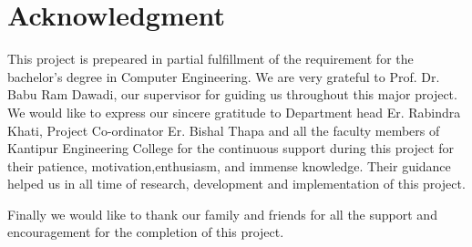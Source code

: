 \chapter*{Acknowledgment}
This project is prepeared in partial fulfillment of the requirement for the bachelor's degree in Computer Engineering. We are very grateful to Prof. Dr. Babu Ram Dawadi, our supervisor for guiding us throughout this major project. We would like to express our sincere gratitude to Department head Er. Rabindra Khati, Project Co-ordinator Er. Bishal Thapa and all the faculty members of Kantipur Engineering College for the continuous support during this project for their patience, motivation,enthusiasm, and immense knowledge. Their guidance helped us in all time of research, development and implementation of this project.\par
Finally we would like to thank our family and friends for all the support and encouragement for the completion of this project.\par
\begin{flushright}
\vskip -20pt
\submittedBy

\end{flushright}

{
\KECadjusttocspacings %
\makeatletter
\def\@makeschapterhead#1{%
  {\newpage \parindent \z@ \raggedright
    \normalfont
    \interlinepenalty\@M
    \center \fontsize{16pt}{1} \bfseries \MakeUppercase{#1}\par\nobreak
  }}
\makeatother 

\tableofcontents %
\listoffigures %
}
